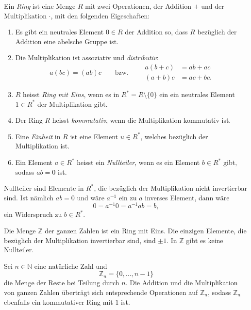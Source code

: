 \begin{definition}[Ring]
%
Ein \emph{Ring} ist eine Menge $R$ mit zwei Operationen,
der Addition $+$ und der Multiplikation $\cdot$, mit den folgenden
Eigeschaften:
\begin{enumerate}
\item
Es gibt ein neutrales Element $0\in R$ der Addition so, dass $R$
bezüglich der Addition eine abelsche Gruppe ist.
\item
Die Multiplikation ist assoziativ und \emph{distributiv}:
%
\begin{equation}
a(bc) = (ab)c
\qquad\text{bzw.}\qquad
\begin{aligned}
a(b+c)&= ab + ac \\
(a+b)c &= ac + bc.
\end{aligned}
\end{equation}
\item
$R$ heisst \emph{Ring mit Eins}, wenn es in $R^*=R\setminus\{0\}$ ein
ein neutrales Element $1\in R^*$ der Multiplikation gibt.
\item
Der Ring $R$ heisst \emph{kommutativ}, wenn die Multiplikation kommutativ ist.
%
\item
Eine \emph{Einheit} in $R$ ist eine Element $u\in R^*$, welches bezüglich
%
der Multiplikation ist.
\item
Ein Element $a\in R^*$ heisst ein \emph{Nullteiler}, wenn es ein Element
%
$b\in R^*$ gibt, sodass $ab=0$ ist.
\end{enumerate}
\end{definition}

Nullteiler sind Elemente in $R^*$, die bezüglich der Multiplikation
nicht invertierbar sind.
Ist nämlich $ab=0$ und wäre $a^{-1}$ ein zu $a$ inverses Element, dann
wäre
\[
0
=
a^{-1}0
=
a^{-1}ab
=
b,
\]
ein Widerspruch zu $b\in R^*$.

\begin{beispiel}
Die Menge $\mathbb{Z}$ der ganzen Zahlen ist ein Ring mit Eins.
Die einzigen Elemente, die bezüglich der Multiplikation invertierbar
sind, sind $\pm 1$.
In $\mathbb{Z}$ gibt es keine Nullteiler.
\end{beispiel}

\begin{beispiel}
Sei $n\in\mathbb{N}$ eine natürliche Zahl und
\[
\mathbb{Z}_n
=
\{
0,\dots, n-1
\}
\]
die Menge der Reste bei Teilung durch $n$.
Die Addition und die Multiplikation von ganzen Zahlen überträgt sich
entsprechende Operationen auf $\mathbb{Z}_n$, sodass $\mathbb{Z}_n$
ebenfalls ein kommutativer Ring mit $1$ ist.
\end{beispiel}

